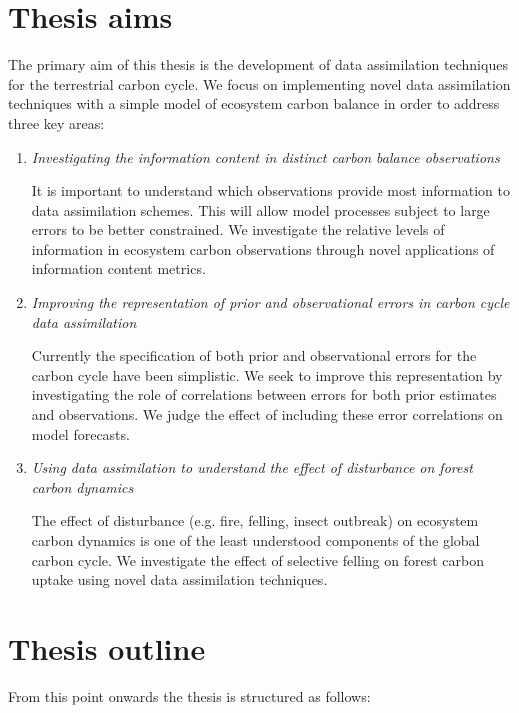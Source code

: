 
\section{Thesis aims}

The primary aim of this thesis is the development of data assimilation techniques for the terrestrial carbon cycle. We focus on implementing novel data assimilation techniques with a simple model of ecosystem carbon balance in order to address three key areas:

\begin{enumerate}
\item \textit{Investigating the information content in distinct carbon balance observations}

It is important to understand which observations provide most information to data assimilation schemes. This will allow model processes subject to large errors to be better constrained. We investigate the relative levels of information in ecosystem carbon observations through novel applications of information content metrics.

\item \textit{Improving the representation of prior and observational errors in carbon cycle data assimilation}

Currently the specification of both prior and observational errors for the carbon cycle have been simplistic. We seek to improve this representation by investigating the role of correlations between errors for both prior estimates and observations. We judge the effect of including these error correlations on model forecasts.
  
\item \textit{Using data assimilation to understand the effect of disturbance on forest carbon dynamics}

The effect of disturbance (e.g. fire, felling, insect outbreak) on ecosystem carbon dynamics is one of the least understood components of the global carbon cycle. We investigate the effect of selective felling on forest carbon uptake using novel data assimilation techniques.
\end{enumerate}

\section{Thesis outline}

From this point onwards the thesis is structured as follows:


